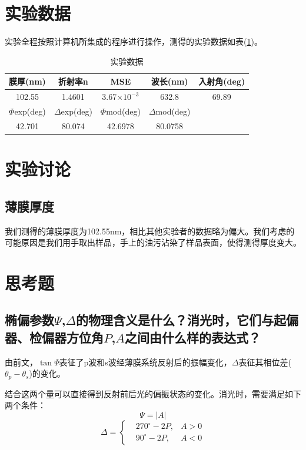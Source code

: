 \documentclass[a4paper]{article}
\begin{document}
\section{实验数据}
实验全程按照计算机所集成的程序进行操作，测得的实验数据如表(\ref{data})。
\begin{table}[!h]
\centering
\caption{实验数据}
\label{data}
\begin{tabular}{|c|c|c|c|c|}
\hline
膜厚(nm)         & 折射率n             & MSE            & 波长(nm)           & 入射角(deg) \\ \hline
102.55         & 1.4601           & 3.67$\times 10^{-3}$      & 632.8            & 69.89    \\ \hline
$\Phi$exp(deg) & $\Delta$exp(deg) & $\Phi$mod(deg) & $\Delta$mod(deg) &          \\ \hline
42.701         & 80.074           & 42.6978        & 80.0758          &          \\ \hline
\end{tabular}
\end{table}

\section{实验讨论}
\subsection{薄膜厚度}
我们测得的薄膜厚度为102.55nm，相比其他实验者的数据略为偏大。我们考虑的可能原因是我们用手取出样品，手上的油污沾染了样品表面，使得测得厚度变大。

\section{思考题}
\subsection{椭偏参数$\Psi$,$\Delta$的物理含义是什么？消光时，它们与起偏器、检偏器方位角$P$,$A$之间由什么样的表达式？}
由前文，$\tan\Psi$表征了p波和s波经薄膜系统反射后的振幅变化，$\Delta$表征其相位差($\theta_p - \theta_s$)的变化。

结合这两个量可以直接得到反射前后光的偏振状态的变化。消光时，需要满足如下两个条件：
$$\Psi=|A|$$
$$\Delta=\left\{\begin{aligned}&270^\circ-2P,&A>0\\&90^\circ-2P,&A<0\end{aligned}\right.$$
\end{document}
